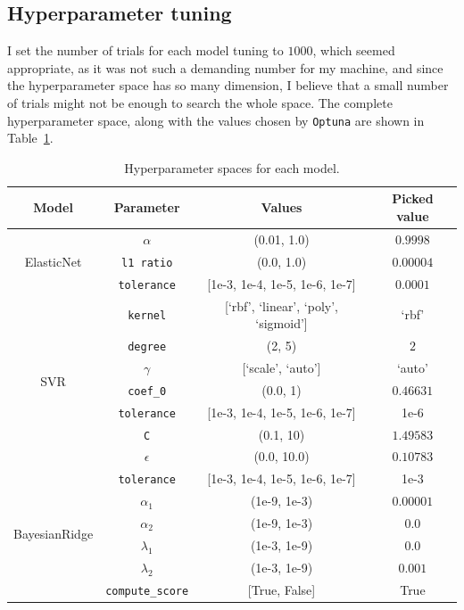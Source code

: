 \documentclass[12pt]{article}
\begin{document}
\subsection{Hyperparameter tuning}
I set the number of trials for each model tuning to $1000$, which seemed appropriate,
as it was not such a demanding number for my machine, and since the hyperparameter
space has so many dimension, I believe that a small number of trials might not be
enough to search the whole space. The complete hyperparameter space, along with the
values chosen by \texttt{Optuna} are shown in Table~\ref{tab:hyperparams}.

\begin{table}[H]
    \centering
    \begin{tabular}{|c|c|c|c|}
        \hline
        \textbf{Model} & \textbf{Parameter} & \textbf{Values} & \textbf{Picked value} \\
        \hline
        \multirow{3}{*}{ElasticNet} 
            & \texttt{$\alpha$} & (0.01, 1.0) & $0.9998$ \\
            & \texttt{l1 ratio} & (0.0, 1.0) & $0.00004$ \\
            & \texttt{tolerance} & [1e-3, 1e-4, 1e-5, 1e-6, 1e-7] & $0.0001$ \\
        \hline
        \multirow{7}{*}{SVR} 
            & \texttt{kernel} & [`rbf', `linear', `poly', `sigmoid'] & `rbf' \\
            & \texttt{degree} & (2, 5) & $2$ \\
            & \texttt{$\gamma$} & [`scale', `auto'] & `auto' \\
            & \texttt{coef\_0} & (0.0, 1) & $0.46631$ \\
            & \texttt{tolerance} & [1e-3, 1e-4, 1e-5, 1e-6, 1e-7] & 1e-6 \\
            & \texttt{C} & (0.1, 10) & $1.49583$ \\
            & \texttt{$\epsilon$} & (0.0, 10.0) & $0.10783$ \\
        \hline
        \multirow{6}{*}{BayesianRidge} 
            & \texttt{tolerance} & [1e-3, 1e-4, 1e-5, 1e-6, 1e-7] & 1e-3 \\
            & \texttt{$\alpha_1$} & (1e-9, 1e-3) & $0.00001$ \\
            & \texttt{$\alpha_2$} & (1e-9, 1e-3) & $0.0$ \\
            & \texttt{$\lambda_1$} & (1e-3, 1e-9) & $0.0$ \\
            & \texttt{$\lambda_2$} & (1e-3, 1e-9) & $0.001$ \\
            & \texttt{compute\_score} & [True, False] & True \\
        \hline
    \end{tabular}
    \caption{Hyperparameter spaces for each model.}
    \label{tab:hyperparams}
\end{table}
\end{document}
